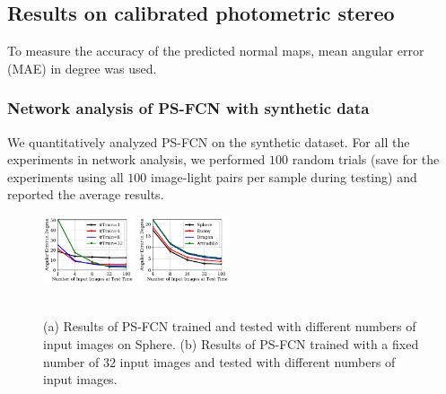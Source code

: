 \documentclass[10pt,journal,compsoc]{IEEEtran}
\begin{document}
\subsection{Results on calibrated photometric stereo}
To measure the accuracy of the predicted normal maps, mean angular error (MAE) in degree was used.

\subsubsection{Network analysis of PS-FCN with synthetic data}
We quantitatively analyzed PS-FCN on the synthetic dataset. 
For all the experiments in network analysis, we performed $100$ random trials (save for the experiments using all $100$ image-light pairs per sample during testing) and reported the average results.


\begin{figure}[t] \centering
    \includegraphics[width=0.24\textwidth]{images/Results/Synth_Test/train_normal_img_num_sensitivity_v3.pdf}
    \includegraphics[width=0.24\textwidth]{images/Results/Synth_Test/test_normal_img_num_sensitivity.pdf} \\ \vspace{-0.5em}
     \hfill
    \\
    \caption{(a) Results of PS-FCN trained and tested with different numbers of input images on {\sc Sphere}. (b) Results of PS-FCN trained with a fixed number of $32$ input images and tested with different numbers of input images.} \label{fig:calib_img_num_syn}
\end{figure}
\end{document}
